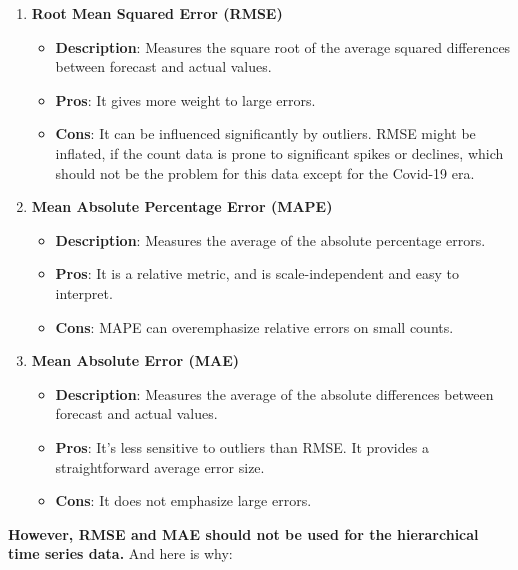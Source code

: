 \documentclass[
]{article}
\providecommand{\tightlist}{%
  \setlength{\itemsep}{0pt}\setlength{\parskip}{0pt}}
\begin{document}
\begin{enumerate}
\def\labelenumi{\arabic{enumi}.}
\tightlist
\item
  \textbf{Root Mean Squared Error (RMSE)}

  \begin{itemize}
  \tightlist
  \item
    \textbf{Description}: Measures the square root of the average squared differences between forecast and actual values.
  \item
    \textbf{Pros}: It gives more weight to large errors.
  \item
    \textbf{Cons}: It can be influenced significantly by outliers. RMSE might be inflated, if the count data is prone to significant spikes or declines, which should not be the problem for this data except for the Covid-19 era.
  \end{itemize}
\item
  \textbf{Mean Absolute Percentage Error (MAPE)}

  \begin{itemize}
  \tightlist
  \item
    \textbf{Description}: Measures the average of the absolute percentage errors.
  \item
    \textbf{Pros}: It is a relative metric, and is scale-independent and easy to interpret.
  \item
    \textbf{Cons}: MAPE can overemphasize relative errors on small counts.
  \end{itemize}
\item
  \textbf{Mean Absolute Error (MAE)}

  \begin{itemize}
  \tightlist
  \item
    \textbf{Description}: Measures the average of the absolute differences between forecast and actual values.
  \item
    \textbf{Pros}: It's less sensitive to outliers than RMSE. It provides a straightforward average error size.
  \item
    \textbf{Cons}: It does not emphasize large errors.
  \end{itemize}
\end{enumerate}

\textbf{However, RMSE and MAE should not be used for the hierarchical time series data.}
And here is why:
\end{document}
